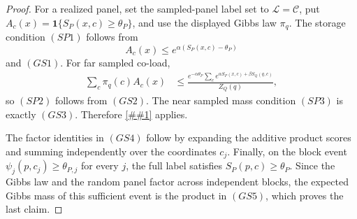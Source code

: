 \documentclass[10pt]{article}
\newcommand{\cref}[1]{\ref{##1}}
\theoremstyle{definition}
\begin{document}
\begin{proof}
   For a realized panel, set the sampled-panel label set to
   \(\mathcal L=\mathcal C\), put
   \(A_c(x)=\mathbf 1\{S_P(x,c)\ge\theta_P\}\), and use the displayed Gibbs
   law \(\pi_q\).  The storage condition \((SP1)\) follows from
   \[
      A_c(x)\le e^{\alpha(S_P(x,c)-\theta_P)}
   \]
   and \((GS1)\).  For far sampled co-load,
   \[
   \begin{aligned}
      \sum_c\pi_q(c)A_c(x)
      &\le
      \frac{
         e^{-\alpha\theta_P}
         \sum_c e^{\alpha S_P(x,c)+\beta S_Q(q,c)}
      }{Z_Q(q)} ,
   \end{aligned}
   \]
   so \((SP2)\) follows from \((GS2)\).  The near sampled mass condition
   \((SP3)\) is exactly \((GS3)\).  Therefore
   \cref{prop:sampled-structured-panel} applies.

   The factor identities in \((GS4)\) follow by expanding the additive product
   scores and summing independently over the coordinates \(c_j\).  Finally, on
   the block event
   \(\psi_j(p,c_j)\ge\theta_{P,j}\) for every \(j\), the full label satisfies
   \(S_P(p,c)\ge\theta_P\).  Since the Gibbs law and the random panel factor
   across independent blocks, the expected Gibbs mass of this sufficient event
   is the product in \((GS5)\), which proves the last claim.
\end{proof}
\end{document}
